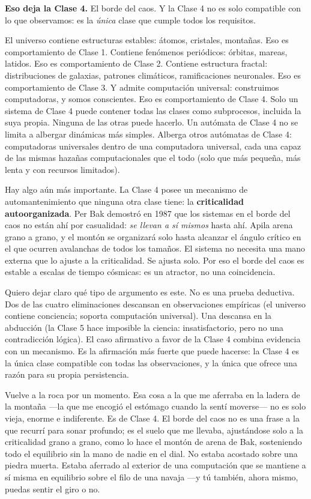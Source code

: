 \documentclass[11pt, twoside, openright]{book}
\begin{document}
\textbf{Eso deja la Clase 4.} El borde del caos. Y la Clase 4 no es solo compatible con lo que observamos: es la \textit{única} clase que cumple todos los requisitos.

El universo contiene estructuras estables: átomos, cristales, montañas. Eso es comportamiento de Clase 1. Contiene fenómenos periódicos: órbitas, mareas, latidos. Eso es comportamiento de Clase 2. Contiene estructura fractal: distribuciones de galaxias, patrones climáticos, ramificaciones neuronales. Eso es comportamiento de Clase 3. Y admite computación universal: construimos computadoras, y somos conscientes. Eso es comportamiento de Clase 4. Solo un sistema de Clase 4 puede contener todas las clases como subprocesos, incluida la suya propia. Ninguna de las otras puede hacerlo. Un autómata de Clase 4 no se limita a albergar dinámicas más simples. Alberga otros autómatas de Clase 4: computadoras universales dentro de una computadora universal, cada una capaz de las mismas hazañas computacionales que el todo (solo que más pequeña, más lenta y con recursos limitados).

Hay algo aún más importante. La Clase 4 posee un mecanismo de automantenimiento que ninguna otra clase tiene: la \textbf{criticalidad autoorganizada}. Per Bak demostró en 1987 que los sistemas en el borde del caos no están ahí por casualidad: \textit{se llevan a sí mismos} hasta ahí. Apila arena grano a grano, y el montón se organizará solo hasta alcanzar el ángulo crítico en el que ocurren avalanchas de todos los tamaños. El sistema no necesita una mano externa que lo ajuste a la criticalidad. Se ajusta solo. Por eso el borde del caos es estable a escalas de tiempo cósmicas: es un atractor, no una coincidencia.

Quiero dejar claro qué tipo de argumento es este. No es una prueba deductiva. Dos de las cuatro eliminaciones descansan en observaciones empíricas (el universo contiene conciencia; soporta computación universal). Una descansa en la abducción (la Clase 5 hace imposible la ciencia: insatisfactorio, pero no una contradicción lógica). El caso afirmativo a favor de la Clase 4 combina evidencia con un mecanismo. Es la afirmación más fuerte que puede hacerse: la Clase 4 es la única clase compatible con todas las observaciones, y la única que ofrece una razón para su propia persistencia.

Vuelve a la roca por un momento. Esa cosa a la que me aferraba en la ladera de la montaña ---la que me encogió el estómago cuando la sentí moverse--- no es solo vieja, enorme e indiferente. Es de Clase 4. El borde del caos no es una frase a la que recurrí para sonar profundo; es el suelo que me llevaba, ajustándose solo a la criticalidad grano a grano, como lo hace el montón de arena de Bak, sosteniendo todo el equilibrio sin la mano de nadie en el dial. No estaba acostado sobre una piedra muerta. Estaba aferrado al exterior de una computación que se mantiene a sí misma en equilibrio sobre el filo de una navaja ---y tú también, ahora mismo, puedas sentir el giro o no.
\end{document}
